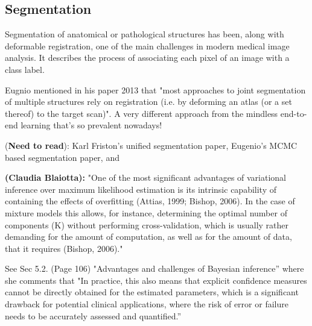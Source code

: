 %

\subsection{Segmentation}
Segmentation of anatomical or pathological structures has been, along with deformable registration, one of the main challenges in modern medical image analysis. It describes the process of associating each pixel of an image with a class label. 

Eugnio mentioned in his paper 2013 \cite{iglesias2011combining} that "most approaches to joint segmentation of multiple structures rely on registration (i.e. by deforming an atlas (or a set thereof) to the target scan)". A very different approach from the mindless end-to-end learning that's so prevalent nowadays!  

(\textbf{Need to read}): Karl Friston's unified segmentation paper, Eugenio's MCMC based segmentation paper, and 

\textbf{(Claudia Blaiotta): } "One of the most significant advantages of variational inference over maximum likelihood estimation is its intrinsic capability of containing the effects of overfitting (Attias, 1999; Bishop, 2006). In the case of mixture models this allows, for instance, determining the optimal number of components (K) without performing cross-validation, which is usually rather demanding for the amount of computation, as well as for the amount of data, that it requires (Bishop, 2006)."

See Sec 5.2. (Page 106) "Advantages and challenges of Bayesian inference” where she comments that 
"In practice, this also means that explicit confidence measures cannot be directly obtained for the estimated parameters, which is a significant drawback for potential clinical applications, where the risk of error or failure needs to be accurately assessed and quantified.” 

